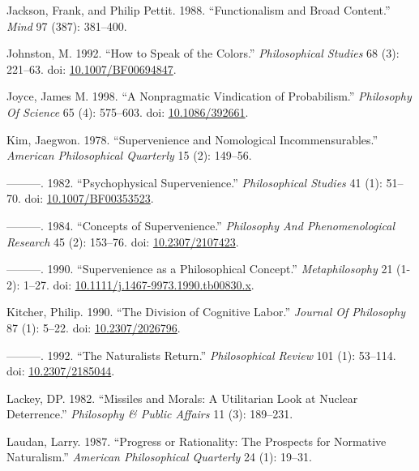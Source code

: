\documentclass[
  10pt,
  letterpaper,
  DIV=11,
  numbers=noendperiod,
  twoside]{scrartcl}
\newlength{\cslhangindent}
\newenvironment{CSLReferences}[2] %
 {\begin{list}{}{%
  \setlength{\itemindent}{0pt}
  \setlength{\leftmargin}{0pt}
  \setlength{\parsep}{0pt}
  \ifodd #1
   \setlength{\leftmargin}{\cslhangindent}
   \setlength{\itemindent}{-1\cslhangindent}
  \fi
  \setlength{\itemsep}{#2\baselineskip}}}
 {\end{list}}
\begin{document}
\begin{CSLReferences}{1}{0}
Jackson, Frank, and Philip Pettit. 1988. {``Functionalism and Broad
Content.''} \emph{Mind} 97 (387): 381--400.

Johnston, M. 1992. {``How to Speak of the Colors.''} \emph{Philosophical
Studies} 68 (3): 221--63. doi:
\href{https://doi.org/10.1007/BF00694847}{10.1007/BF00694847}.

Joyce, James M. 1998. {``A Nonpragmatic Vindication of Probabilism.''}
\emph{Philosophy Of Science} 65 (4): 575--603. doi:
\href{https://doi.org/10.1086/392661}{10.1086/392661}.

Kim, Jaegwon. 1978. {``Supervenience and Nomological
Incommensurables.''} \emph{American Philosophical Quarterly} 15 (2):
149--56.

---------. 1982. {``Psychophysical Supervenience.''} \emph{Philosophical
Studies} 41 (1): 51--70. doi:
\href{https://doi.org/10.1007/BF00353523}{10.1007/BF00353523}.

---------. 1984. {``Concepts of Supervenience.''} \emph{Philosophy And
Phenomenological Research} 45 (2): 153--76. doi:
\href{https://doi.org/10.2307/2107423}{10.2307/2107423}.

---------. 1990. {``Supervenience as a Philosophical Concept.''}
\emph{Metaphilosophy} 21 (1-2): 1--27. doi:
\href{https://doi.org/10.1111/j.1467-9973.1990.tb00830.x}{10.1111/j.1467-9973.1990.tb00830.x}.

Kitcher, Philip. 1990. {``The Division of Cognitive Labor.''}
\emph{Journal Of Philosophy} 87 (1): 5--22. doi:
\href{https://doi.org/10.2307/2026796}{10.2307/2026796}.

---------. 1992. {``The Naturalists Return.''} \emph{Philosophical
Review} 101 (1): 53--114. doi:
\href{https://doi.org/10.2307/2185044}{10.2307/2185044}.

Lackey, DP. 1982. {``Missiles and Morals: A Utilitarian Look at Nuclear
Deterrence.''} \emph{Philosophy \& Public Affairs} 11 (3): 189--231.

Laudan, Larry. 1987. {``Progress or Rationality: The Prospects for
Normative Naturalism.''} \emph{American Philosophical Quarterly} 24 (1):
19--31.


\end{CSLReferences}
\end{document}
